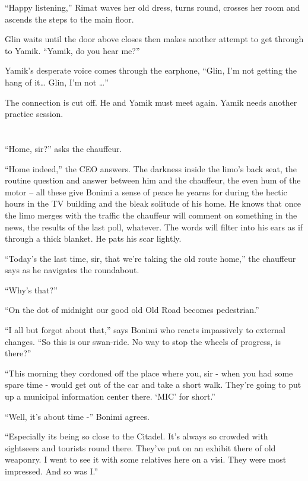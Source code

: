 \documentclass[twoside,11pt]{book}
\begin{document}
``Happy listening,'' Rimat waves her old dress, turns round, crosses her room and ascends the
steps to the main floor.

Glin waits until the door above closes then makes another attempt to get through to Yamik. ``Yamik, do you
hear me?''

Yamik's desperate voice comes through the earphone, ``Glin, I'm not getting the hang of it{\dots} Glin, I'm
not {\dots}''

The connection is cut off. He and Yamik must meet again. Yamik needs another practice session.



\chapter{}

``Home, sir?'' asks the chauffeur.

``Home indeed,'' the CEO answers. The darkness inside the limo's back seat,
the routine question and answer between him and the chauffeur, the even hum of the motor -- all these give Bonimi a
sense of peace he yearns for during the hectic hours in the TV building and the bleak solitude of his
home. He knows that once the limo merges with the traffic the chauffeur will comment on something in the news, the
results of the last poll, whatever. The words will filter into his ears as if through a thick blanket. He pats his
scar lightly.

``Today's the last time, sir, that we're taking the old route home,'' the chauffeur says as he
navigates the roundabout.

``Why's that?''

``On the dot of midnight our good old Old Road becomes pedestrian.''

``I all but forgot about that,'' says Bonimi who reacts impassively to external changes.
``So this is our swan-ride. No way to stop the wheels of progress, is there?''

``This morning they cordoned off the place where you, sir - when you had some spare time - would get out of
the car and take a short walk. They're going to put up a municipal information center there. `MIC' for
short.''

``Well, it's about time -'' Bonimi agrees.

``Especially its being so close to the Citadel. It's always so crowded with sightseers and tourists round
there. They've put on an exhibit there of old weaponry. I went to see it with some relatives here on a visi. They were
most impressed. And so was I.''
\end{document}
